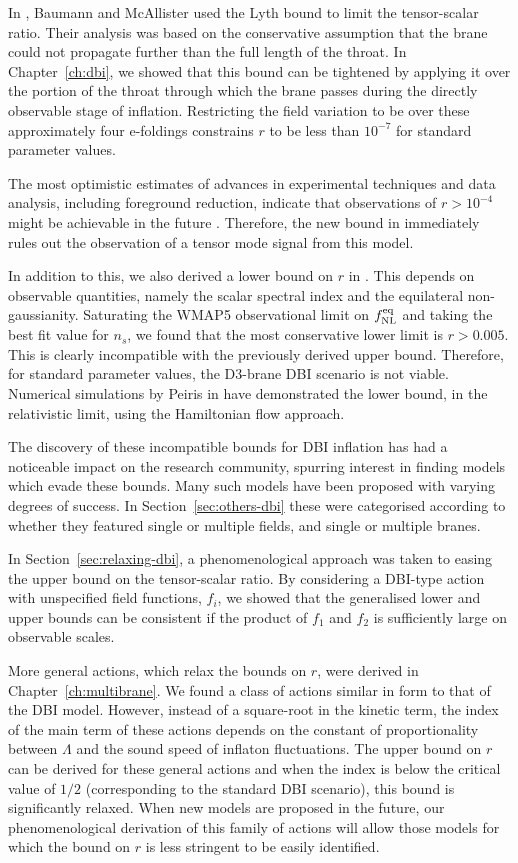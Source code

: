 In , Baumann and McAllister used the Lyth bound \cite{lyth} to limit
the tensor-scalar ratio. Their analysis was based on the conservative assumption that the brane
could
not propagate further than the full length of the throat. In Chapter~\ref{ch:dbi},
we showed that this bound can be tightened by applying it over the
portion of the throat through which the brane passes during the directly observable
stage of inflation. Restricting the field variation to be over these
approximately four e-foldings constrains $r$ to be less than $10^{-7}$ for standard
parameter values.

The most optimistic estimates of advances in experimental techniques and data
analysis, including foreground reduction, indicate that observations of $r>10^{-4}$
might be achievable in the future \cite{Baumann:2008aq,vpj}. Therefore, the new bound in
 immediately rules out the observation of a tensor mode signal
from this model.

In addition to this, we also derived a lower bound on $r$ in .
This depends on observable quantities, namely the scalar spectral index and the
equilateral non-gaussianity. Saturating the WMAP5 observational limit on $f_{\mathrm{NL}}^{\mathrm{eq}}$
and taking the best fit value for $n_s$, we found that the most conservative lower
limit is $r>0.005$. This is clearly incompatible with the previously derived upper
bound. Therefore, for standard parameter values, the D3-brane DBI scenario is not
viable. Numerical simulations by Peiris \etal in  have
demonstrated the lower bound, in the relativistic limit, using the
Hamiltonian flow approach.

The discovery of these incompatible bounds for DBI inflation has had a noticeable
impact on the research community, spurring interest in finding models which evade
these bounds. Many such models have been proposed with varying degrees of success. In
Section~\ref{sec:others-dbi} these were categorised according to whether they
featured single or multiple fields, and single or multiple branes. 

In Section~\ref{sec:relaxing-dbi}, a phenomenological approach was taken to easing
the upper bound on the tensor-scalar ratio. By considering a DBI-type action with unspecified field
functions,
$f_i$, we showed that the generalised lower and upper bounds can be consistent
if the product of $f_1$ and $f_2$ is sufficiently large on observable scales.


More general actions, which relax the bounds on $r$, were derived in
Chapter~\ref{ch:multibrane}. 
We found a class of actions similar in form to that of the DBI model. 
However, instead of a square-root in the kinetic term, the index of the main term of these
actions depends on the constant of proportionality between $\Lambda$ and the sound
speed of inflaton fluctuations.
The upper bound on $r$ can be derived for these general actions and when the index
is below the critical value of $1/2$ (corresponding to the standard DBI scenario), this bound is
significantly relaxed.  
When new models are proposed in the future, our phenomenological derivation of this family of
actions will allow those models for which the bound on $r$ is less stringent to be easily
identified.


